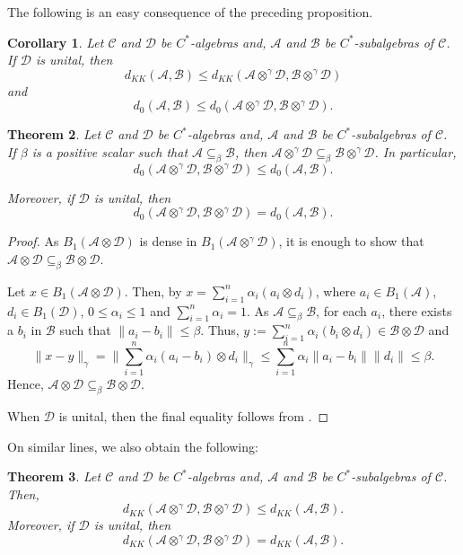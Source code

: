 \documentclass{amsart}
\numberwithin{equation}{section}
\newcommand{\mcal}{\mathcal}
\newcommand{\1}{\mathbf{1}}
\newcommand{\mA}{\mathcal{A}}
\newcommand{\mB}{\mathcal{B}}
\newcommand{\mC}{\mathcal{C}}
\newcommand{\mD}{\mathcal{D}}
\newtheorem{theorem}{Theorem}[section]
\newtheorem{cor}[theorem]{Corollary}
\begin{document}
The following is an easy consequence of the preceding proposition. 
\begin{cor}\label{D-unital}
 Let $\mC $ and $\mD $ be $C^*$-algebras and, $\mA$ and $\mB$ be
 $C^*$-subalgebras of $\mC$. If $\mD$ is unital, then
\[
d_{KK}(\mA, \mB)\leq d_{KK}(\mA \otimes^{\gamma} \mD, \mB \otimes^{\gamma} \mD)
\]
 and \[
d_{0}(\mA, \mB)\leq d_{0}(\mA \otimes^{\gamma} \mD, \mB \otimes^{\gamma} \mD).
\]
\end{cor}

\begin{theorem}\label{Projective-Ch}
Let $\mC$ and $\mD$ be $C^*$-algebras and, $\mA$ and $\mB$ be
$C^*$-subalgebras of $\mC$. If $\beta$ is a positive scalar such that
$\mA \subseteq_{\beta}\mB$, then $\mA \otimes^{\gamma} \mD
\subseteq_{\beta}\mB \otimes^{\gamma} \mD$.  In particular,
$$d_0(\mA \otimes^{\gamma} \mD, \mB \otimes^{\gamma} \mD) \leq
d_0(\mA, \mB).$$

Moreover, if $\mD$ is unital, then
$$d_{0}(\mA \otimes^{\gamma} \mD, \mB \otimes^{\gamma} \mD) = d_{0}(\mA, \mB).$$ 
\end{theorem}

\begin{proof}
As $B_{1}(\mA \otimes \mD)$ is dense in $B_{1}(\mA \otimes^{\gamma}
\mD)$, it is enough to show that $\mA \otimes \mD \subseteq_{\beta}\mB
\otimes \mD$.

Let $x\in B_{1}(\mA \otimes \mD)$. Then, by  $x=
\sum_{i=1}^{n}\alpha_{i} (a_{i}\otimes d_{i})$, where $a_{i}\in
B_{1}(\mA)$, $d_{i}\in B_{1}(\mD)$, $0\leq \alpha_{i}\leq 1$ and
$\sum_{i=1}^{n}\alpha_{i}= 1$. As $\mA \subseteq_{\beta} \mB$, for
each $a_{i}$, there exists a $b_{i}$ in $\mB$ such that
\(
\|a_{i}-b_{i}\| \leq  \beta.
\) 
Thus, $y := \sum_{i=1}^{n}\alpha_{i} (b_{i}\otimes d_{i})\in \mB\otimes \mD$ and 
\[
\|x-y\|_{\gamma} = 
\|\sum_{i=1}^{n}\alpha_{i} (a_{i}-b_{i})\otimes d_{i}\|_{\gamma} \leq  \sum_{i=1}^{n}\alpha_{i} \|a_{i}-b_{i}\|\|d_{i}\|  \leq
  \beta.
\]
Hence, $\mA \otimes \mD \subseteq_{\beta}\mB
\otimes \mD$.

When $\mcal{D}$ is unital, then the final equality follows from
.
\end{proof}
On similar lines, we also obtain the following:
\begin{theorem}\label{Projective-KK}
Let $\mC$ and $\mD$ be $C^*$-algebras and, $\mA$ and $\mB$ be
 $C^*$-subalgebras of $\mC$. Then,
$$ d_{KK}(\mA \otimes^{\gamma} \mD, \mB \otimes^{\gamma} \mD) \leq
d_{KK}(\mA, \mB).$$ Moreover, if $\mD$ is unital, then
$$d_{KK}(\mA \otimes^{\gamma} \mD, \mB \otimes^{\gamma} \mD) = d_{KK}(\mA, \mB).$$  
\end{theorem}
\end{document}
